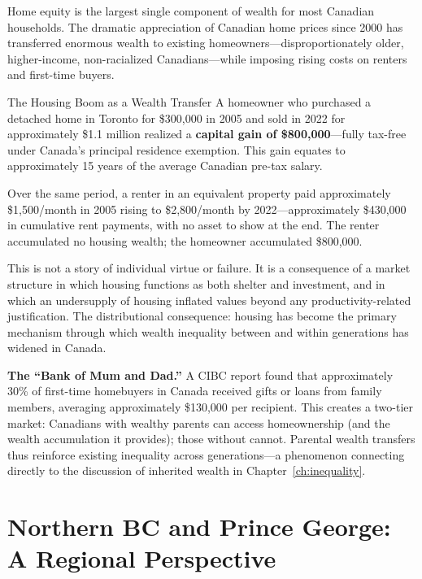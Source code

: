 Home equity is the largest single component of wealth for most Canadian households. The dramatic appreciation of Canadian home prices since 2000 has transferred enormous wealth to existing homeowners---disproportionately older, higher-income, non-racialized Canadians---while imposing rising costs on renters and first-time buyers.

\begin{canexample}{The Housing Boom as a Wealth Transfer}
A homeowner who purchased a detached home in Toronto for \$300,000 in 2005 and sold in
2022 for approximately \$1.1 million realized a \textbf{capital gain of \$800,000}---fully
tax-free under Canada's principal residence exemption. This gain equates to approximately
15 years of the average Canadian pre-tax salary.

Over the same period, a renter in an equivalent property paid approximately \$1,500/month
in 2005 rising to \$2,800/month by 2022---approximately \$430,000 in cumulative rent
payments, with no asset to show at the end. The renter accumulated no housing wealth;
the homeowner accumulated \$800,000.

This is not a story of individual virtue or failure. It is a consequence of a market
structure in which housing functions as both shelter and investment, and in which an
undersupply of housing inflated values beyond any productivity-related justification.
The distributional consequence: housing has become the primary mechanism through which
wealth inequality between and within generations has widened in Canada.
\end{canexample}

\textbf{The ``Bank of Mum and Dad.''} A CIBC report found that approximately 30\% of first-time homebuyers in Canada received gifts or loans from family members, averaging approximately \$130,000 per recipient. This creates a two-tier market: Canadians with wealthy parents can access homeownership (and the wealth accumulation it provides); those without cannot. Parental wealth transfers thus reinforce existing inequality across generations---a phenomenon connecting directly to the discussion of inherited wealth in Chapter~\ref{ch:inequality}.

\section{Northern BC and Prince George: A Regional Perspective}

